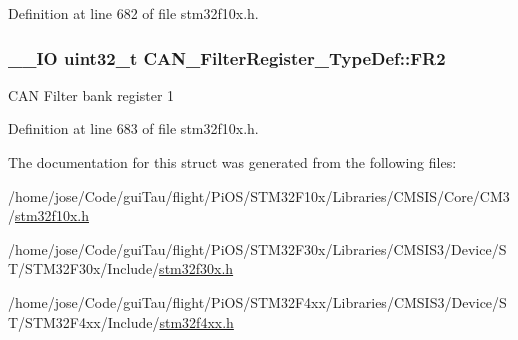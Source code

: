 Definition at line 682 of file stm32f10x.\-h.

\hypertarget{struct_c_a_n___filter_register___type_def_a77959e28a302b05829f6a1463be7f800}{
\subsubsection[{F\-R2}]{\setlength{\rightskip}{0pt plus 5cm}\-\_\-\-\_\-\-I\-O {\bf uint32\-\_\-t} C\-A\-N\-\_\-\-Filter\-Register\-\_\-\-Type\-Def\-::\-F\-R2}}\label{struct_c_a_n___filter_register___type_def_a77959e28a302b05829f6a1463be7f800}
C\-A\-N Filter bank register 1 

Definition at line 683 of file stm32f10x.\-h.



The documentation for this struct was generated from the following files\-:\begin{DoxyCompactItemize}
\item 
/home/jose/\-Code/gui\-Tau/flight/\-Pi\-O\-S/\-S\-T\-M32\-F10x/\-Libraries/\-C\-M\-S\-I\-S/\-Core/\-C\-M3/\hyperlink{stm32f10x_8h}{stm32f10x.\-h}\item 
/home/jose/\-Code/gui\-Tau/flight/\-Pi\-O\-S/\-S\-T\-M32\-F30x/\-Libraries/\-C\-M\-S\-I\-S3/\-Device/\-S\-T/\-S\-T\-M32\-F30x/\-Include/\hyperlink{stm32f30x_8h}{stm32f30x.\-h}\item 
/home/jose/\-Code/gui\-Tau/flight/\-Pi\-O\-S/\-S\-T\-M32\-F4xx/\-Libraries/\-C\-M\-S\-I\-S3/\-Device/\-S\-T/\-S\-T\-M32\-F4xx/\-Include/\hyperlink{stm32f4xx_8h}{stm32f4xx.\-h}\end{DoxyCompactItemize}
